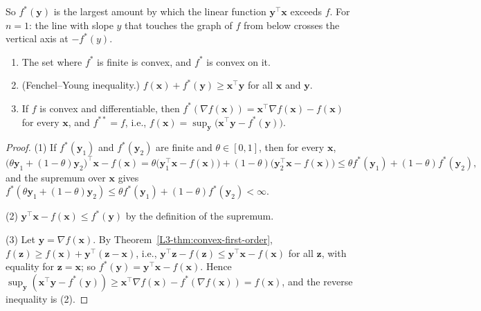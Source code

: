 So $f^*(\mathbf{y})$ is the largest amount by which the linear function $\mathbf{y}^\top\mathbf{x}$ exceeds $f$. For $n = 1$: the line with slope $y$ that touches the graph of $f$ from below crosses the vertical axis at $-f^*(y)$.

\begin{proposition}\label{L3-prop:conjugate}
    \begin{enumerate}
        \item The set where $f^*$ is finite is convex, and $f^*$ is convex on it.
        \item (Fenchel--Young inequality.) $f(\mathbf{x}) + f^*(\mathbf{y}) \geq \mathbf{x}^\top\mathbf{y}$ for all $\mathbf{x}$ and $\mathbf{y}$.
        \item If $f$ is convex and differentiable, then $f^*(\nabla f(\mathbf{x})) = \mathbf{x}^\top\nabla f(\mathbf{x}) - f(\mathbf{x})$ for every $\mathbf{x}$, and $f^{**} = f$, i.e., $f(\mathbf{x}) = \sup_{\mathbf{y}}\big(\mathbf{x}^\top\mathbf{y} - f^*(\mathbf{y})\big)$.
    \end{enumerate}
\end{proposition}

\begin{proof}
    (1) If $f^*(\mathbf{y}_1)$ and $f^*(\mathbf{y}_2)$ are finite and $\theta \in [0, 1]$, then for every $\mathbf{x}$,
    \[\big(\theta\mathbf{y}_1 + (1 - \theta)\mathbf{y}_2\big)^\top\mathbf{x} - f(\mathbf{x}) = \theta\big(\mathbf{y}_1^\top\mathbf{x} - f(\mathbf{x})\big) + (1 - \theta)\big(\mathbf{y}_2^\top\mathbf{x} - f(\mathbf{x})\big) \leq \theta f^*(\mathbf{y}_1) + (1 - \theta)f^*(\mathbf{y}_2),\]
    and the supremum over $\mathbf{x}$ gives $f^*(\theta\mathbf{y}_1 + (1 - \theta)\mathbf{y}_2) \leq \theta f^*(\mathbf{y}_1) + (1 - \theta)f^*(\mathbf{y}_2) < \infty$.

    (2) $\mathbf{y}^\top\mathbf{x} - f(\mathbf{x}) \leq f^*(\mathbf{y})$ by the definition of the supremum.

    (3) Let $\mathbf{y} = \nabla f(\mathbf{x})$. By Theorem~\ref{L3-thm:convex-first-order}, $f(\mathbf{z}) \geq f(\mathbf{x}) + \mathbf{y}^\top(\mathbf{z} - \mathbf{x})$, i.e., $\mathbf{y}^\top\mathbf{z} - f(\mathbf{z}) \leq \mathbf{y}^\top\mathbf{x} - f(\mathbf{x})$ for all $\mathbf{z}$, with equality for $\mathbf{z} = \mathbf{x}$; so $f^*(\mathbf{y}) = \mathbf{y}^\top\mathbf{x} - f(\mathbf{x})$. Hence $\sup_{\mathbf{y}}(\mathbf{x}^\top\mathbf{y} - f^*(\mathbf{y})) \geq \mathbf{x}^\top\nabla f(\mathbf{x}) - f^*(\nabla f(\mathbf{x})) = f(\mathbf{x})$, and the reverse inequality is (2).
\end{proof}

